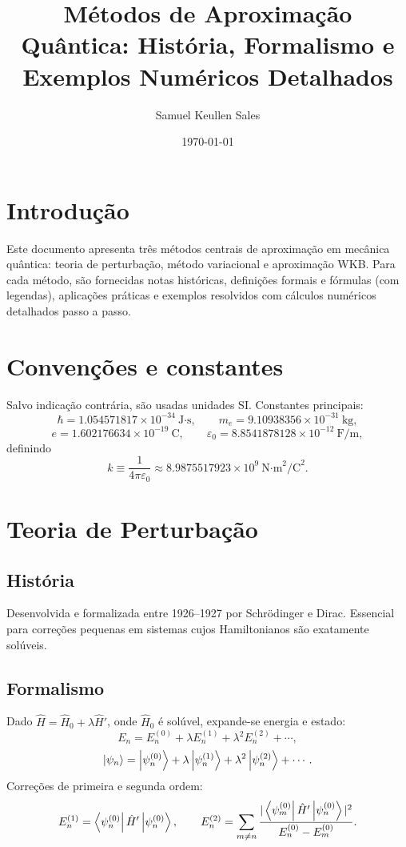 \documentclass[12pt]{article}
\title{Métodos de Aproximação Quântica: História, Formalismo e Exemplos Numéricos Detalhados}
\author{Samuel Keullen Sales}
\date{\today}
\begin{document}
\maketitle

\section{Introdução}
Este documento apresenta três métodos centrais de aproximação em mecânica quântica: teoria de perturbação, método variacional e aproximação WKB. Para cada método, são fornecidas notas históricas, definições formais e fórmulas (com legendas), aplicações práticas e exemplos resolvidos com cálculos numéricos detalhados passo a passo.

\section{Convenções e constantes}
Salvo indicação contrária, são usadas unidades SI. Constantes principais:
\[
\hbar = 1.054571817\times 10^{-34}\ \text{J·s},\qquad
m_e = 9.10938356\times 10^{-31}\ \text{kg},
\]
\[
e = 1.602176634\times 10^{-19}\ \text{C},\qquad
\varepsilon_0 = 8.8541878128\times 10^{-12}\ \text{F/m},
\]
definindo
\[
k\equiv\frac{1}{4\pi\varepsilon_0}\approx 8.9875517923\times 10^{9}\ \text{N·m}^2\text{/C}^2.
\]

\section{Teoria de Perturbação}

\subsection{História}
Desenvolvida e formalizada entre 1926--1927 por Schrödinger e Dirac. Essencial para correções pequenas em sistemas cujos Hamiltonianos são exatamente solúveis.

\subsection{Formalismo}
Dado $\hat H=\hat H_0+\lambda \hat H'$, onde $\hat H_0$ é solúvel, expande-se energia e estado:
\[
E_n = E_n^{(0)} + \lambda E_n^{(1)} + \lambda^2 E_n^{(2)} + \cdots,
\]
\[
\ket{\psi_n} = \ket{\psi_n^{(0)}} + \lambda \ket{\psi_n^{(1)}} + \lambda^2 \ket{\psi_n^{(2)}} + \cdots.
\]
Correções de primeira e segunda ordem:
\[
E_n^{(1)} = \bra{\psi_n^{(0)}}\hat H'\ket{\psi_n^{(0)}},\qquad
E_n^{(2)} = \sum_{m\ne n}\frac{|\bra{\psi_m^{(0)}}\hat H'\ket{\psi_n^{(0)}}|^2}{E_n^{(0)}-E_m^{(0)}}.
\]
\end{document}
